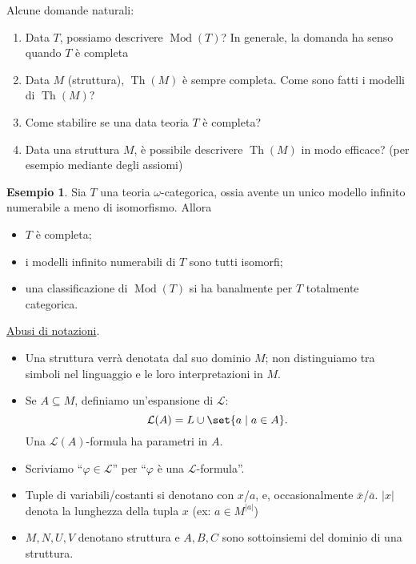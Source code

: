 \documentclass[10pt]{article}
\newcommand{\1}{\mathds{1}}
\theoremstyle{definition}%
\newtheorem{esempio}[thm]{Esempio}
\theoremstyle{plain}
\theoremstyle{remark}
\begin{document}
Alcune domande naturali:
\begin{enumerate}
\item Data \(T\), possiamo descrivere \(\operatorname{Mod}(T)\)? In generale, la domanda ha senso quando \(T\) è completa
\item Data \(M\) (struttura), \(\operatorname{Th}(M)\) è sempre completa. Come sono fatti i modelli di \(\operatorname{Th}(M)\)?
\item Come stabilire se una data teoria \(T\) è completa?
\item Data una struttura \(M\), è possibile descrivere \(\operatorname{Th}(M)\) in modo efficace? (per esempio mediante degli assiomi)
\end{enumerate}

\begin{esempio}
Sia \(T\) una teoria \(\omega\)-categorica, ossia avente un unico modello infinito numerabile a meno di isomorfismo. Allora
\begin{itemize}
\item \(T\) è completa;
\item i modelli infinito numerabili di \(T\) sono tutti isomorfi;
\item una classificazione di \(\operatorname{Mod}(T)\) si ha banalmente per \(T\) totalmente categorica.
\end{itemize}
\end{esempio}

\uline{Abusi di notazioni}.
\begin{itemize}
\item Una struttura verrà denotata dal suo dominio \(M\); non distinguiamo tra simboli nel linguaggio e le loro interpretazioni in \(M\).
\item Se \(A \subseteq M\), definiamo un'espansione di \(\mathcal{L}\):
\begin{equation*}
  \mathcal{L}(A) = L\cup\set{a \mid a \in A}.
\end{equation*}
Una \(\mathcal{L}(A)\)-formula ha parametri in \(A\).
\item Scriviamo ``\(\varphi \in \mathcal{L}\)'' per ``\(\varphi\) è una \(\mathcal{L}\)-formula''.
\item Tuple di variabili/costanti si denotano con \(x\)/\(a\), e, occasionalmente \(\bar{x}\)/\(\bar{a}\). \(|x|\) denota la lunghezza della tupla \(x\) (ex: \(a \in M^{|a|}\))
\item \(M,N,U,V\) denotano struttura e \(A,B,C\) sono sottoinsiemi del dominio di una struttura.
\end{itemize}
\end{document}
